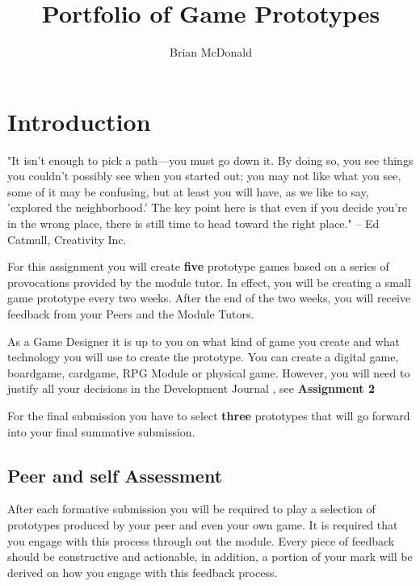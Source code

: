 \documentclass{../../fal_assignment}
\title{Portfolio of Game Prototypes}
\author{Brian McDonald}
\begin{document}
\maketitle

\section*{Introduction}

\begin{marginquote}
"It isn't enough to pick a path—you must go down it. By doing so, you see things you couldn't possibly see when you started out; you may not like what you see, some of it may be confusing, but at least you will have, as we like to say, 'explored the neighborhood.' The key point here is that even if you decide you're in the wrong place, there is still time to head toward the right place."
-- Ed Catmull, Creativity Inc.

\end{marginquote}

For this assignment you will create \textbf{five} prototype games based on a series of provocations provided by the module tutor. In effect, you will be creating a small game prototype every two weeks. After the end of the two weeks, you will receive feedback from your Peers and the Module Tutors.

As a Game Designer it is up to you on what kind of game you create and what technology you will use to create the prototype. You can create a digital game, boardgame, cardgame, RPG Module or physical game. However, you will need to justify all your decisions in the Development Journal , see \textbf{Assignment 2}

For the final submission you have to select \textbf{three} prototypes that will go forward into your final summative submission.

\subsection*{Peer and self Assessment}
After each formative submission you will be required to play a selection of prototypes produced by your peer and even your own game. It is required that you engage with
this process through out the module. Every piece of feedback should be constructive and actionable, in addition, a portion of your mark will be derived on how you engage with this
feedback process. 
\end{document}

